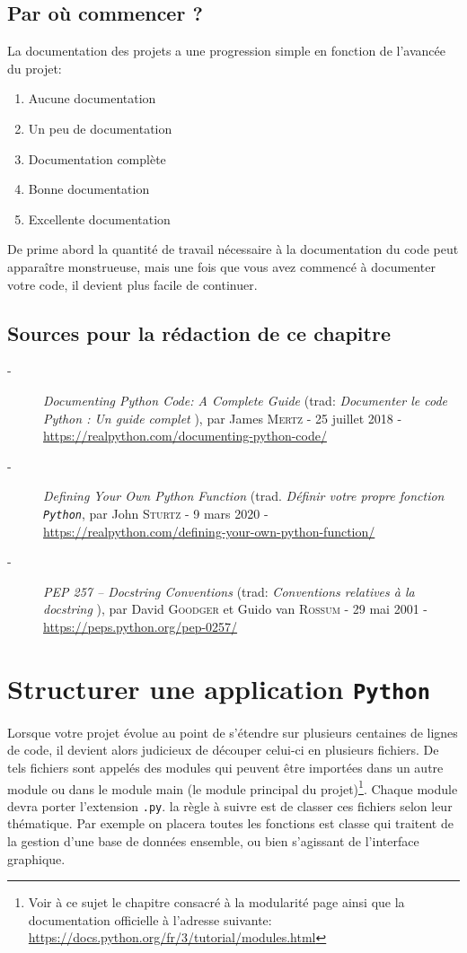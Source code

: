 \documentclass[a4paper,11pt]{book}
\begin{document}
\section{Par où commencer ?}

La documentation des projets a une progression simple en fonction de l'avancée du projet:
\begin{enumerate}
	\item Aucune documentation
	\item Un peu de documentation
	\item Documentation complète
	\item Bonne documentation
	\item Excellente documentation
\end{enumerate}
\medskip

De prime abord la quantité de travail nécessaire à la documentation du code peut apparaître monstrueuse, mais une fois que vous avez commencé à documenter votre code, il devient plus facile de continuer.
\medskip

\section*{Sources pour la rédaction de ce chapitre}
\begin{description}
	\item[-] \textit{Documenting Python Code: A Complete Guide} (trad: \og \textit{Documenter le code Python : Un guide complet} \fg{}), par James \textsc{Mertz} - 25 juillet 2018 - \url{https://realpython.com/documenting-python-code/}
	\item[-] \textit{Defining Your Own Python Function} (trad. \textit{Définir votre propre fonction \texttt{Python}}, par John \textsc{Sturtz} - 9 mars 2020 - \\
	\url{https://realpython.com/defining-your-own-python-function/}
	\item[-] \textit{PEP 257 – Docstring Conventions} (trad: \og \textit{Conventions relatives à la docstring} \fg{}), par David \textsc{Goodger} et Guido van \textsc{Rossum} - 29 mai 2001 - \url{https://peps.python.org/pep-0257/}
\end{description}
\medskip

\chapter{Structurer une application \texttt{Python}}
Lorsque votre projet évolue au point de s'étendre sur plusieurs centaines de lignes de code, il devient alors judicieux de découper celui-ci en plusieurs fichiers. De tels fichiers sont appelés des modules qui peuvent être importées dans un autre module ou dans le module main (le module principal du projet)\footnote{Voir à ce sujet le chapitre consacré à la modularité page \pageref{modularité} ainsi que la documentation officielle à l'adresse suivante: \url{https://docs.python.org/fr/3/tutorial/modules.html}}. Chaque module devra porter l'extension \texttt{.py}. la règle à suivre est de classer ces fichiers selon leur thématique. Par exemple on placera toutes les fonctions est classe qui traitent de la gestion d'une base de données ensemble, ou bien s'agissant de l'interface graphique.
\medskip
\end{document}
